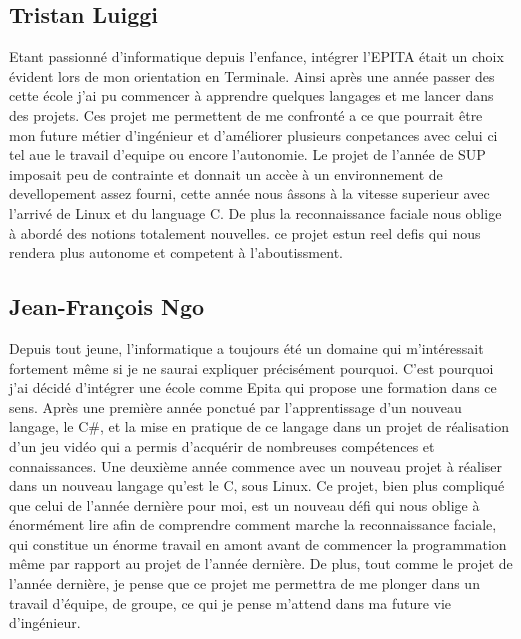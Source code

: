 \documentclass[12pt,a4paper]{article}
\begin{document}
\subsection{Tristan Luiggi}
Etant passionné d'informatique depuis l'enfance, intégrer l'EPITA était un choix évident lors de mon orientation en Terminale. Ainsi après une année passer des cette école j'ai pu commencer à apprendre quelques langages et me lancer dans des projets. Ces projet me permettent de me confronté a ce que pourrait être mon future métier d'ingénieur et d'améliorer plusieurs conpetances avec celui ci tel aue le travail d'equipe ou encore l'autonomie.
Le projet de l'année de SUP imposait peu de contrainte et donnait un accèe à un environnement de devellopement assez fourni, cette année nous âssons à la vitesse superieur avec l'arrivé de Linux et du language C. De plus la reconnaissance faciale nous oblige à abordé des notions totalement nouvelles. ce projet estun reel defis qui nous rendera plus autonome et competent à l'aboutissment.

\newpage

\subsection{Jean-François Ngo}
Depuis tout jeune, l'informatique a toujours été un domaine qui m'intéressait fortement même si je ne saurai expliquer précisément pourquoi. C'est pourquoi j'ai décidé d'intégrer une école comme Epita qui propose une formation dans ce sens. Après une première année ponctué par l'apprentissage d'un nouveau langage, le C\#, et la mise en pratique de ce langage dans un projet de réalisation d'un jeu vidéo qui a permis d'acquérir de nombreuses compétences et connaissances. Une deuxième année commence avec un nouveau projet à réaliser dans un nouveau langage qu'est le C, sous Linux. Ce projet, bien plus compliqué que celui de l'année dernière pour moi, est un nouveau défi qui nous oblige à énormément lire afin de comprendre comment marche la reconnaissance faciale, qui constitue un énorme travail en amont avant de commencer la programmation même par rapport au projet de l'année dernière. De plus, tout comme le projet de l'année dernière, je pense que ce projet me permettra de me plonger dans un travail d'équipe, de groupe, ce qui je pense m'attend dans ma future vie d'ingénieur.
\end{document}
